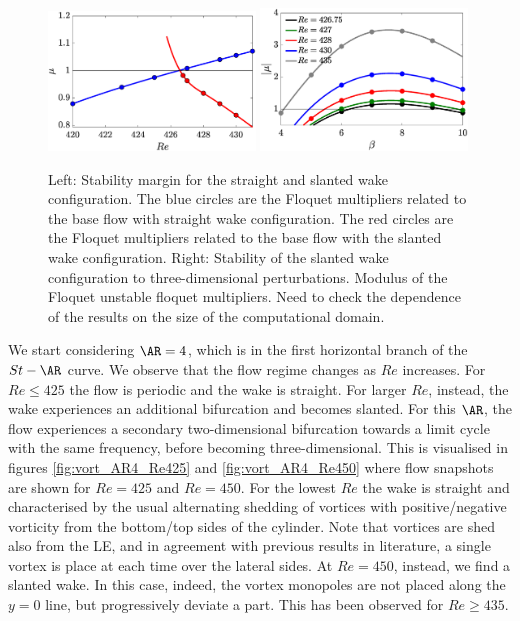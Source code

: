 \documentclass[onecolumn,notitlepage,superscriptaddress, amsmath,amssymb,longbibliographyaps,floatfix]{revtex4-1}
\begin{document}
\begin{figure}
\centering
\includegraphics[width=0.49\textwidth]{./fig/AR4_2Dbif_multipliers.eps}
\includegraphics[width=0.49\textwidth]{./fig/AR4_3Dbif_multipliers.eps}
\caption{Left: Stability margin for the straight and slanted wake configuration. The blue circles are the Floquet multipliers related to the base flow with straight wake configuration. The red circles are the Floquet multipliers related to the base flow with the slanted wake configuration. Right: Stability of the slanted wake configuration to three-dimensional perturbations. Modulus of the Floquet unstable floquet multipliers. {\color{red} Need to check the dependence of the results on the size of the computational domain}.}
\label{fig:2Dmultipliers}
\end{figure}

We start considering $\AR=4$, which is in the first horizontal branch of the $St-\AR$ curve. We observe that the flow regime changes as $Re$ increases. For $Re \le 425$ the flow is periodic and the wake is straight. For larger $Re$, instead, the wake experiences an additional bifurcation and becomes slanted. For this $\AR$, the flow experiences a secondary two-dimensional bifurcation towards a limit cycle with the same frequency, before becoming three-dimensional. This is visualised in figures \ref{fig:vort_AR4_Re425} and \ref{fig:vort_AR4_Re450} where flow snapshots are shown for $Re=425$ and $Re=450$. For the lowest $Re$ the wake is straight and characterised by the usual alternating shedding of vortices with positive/negative vorticity from the bottom/top sides of the cylinder. Note that vortices are shed also from the LE, and in agreement with previous results in literature, a single vortex is place at each time over the lateral sides. At $Re=450$, instead, we find a slanted wake. In this case, indeed, the vortex monopoles are not placed along the $y=0$ line, but progressively deviate a part. This has been observed for $Re \ge 435$. 
\end{document}
